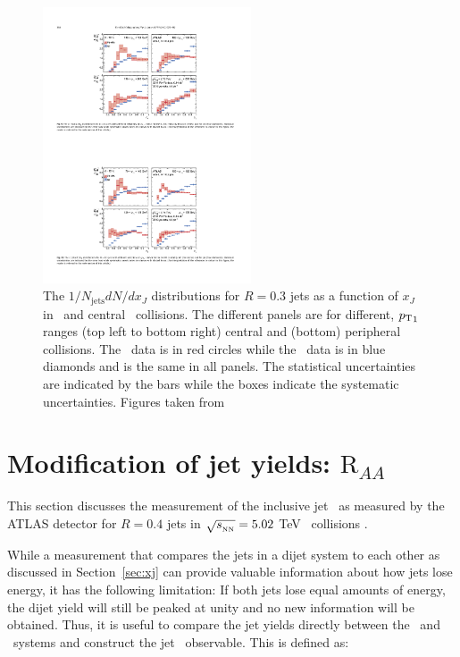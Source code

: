 \begin{figure}[htbp]
\begin{center}
\includegraphics[width=0.55\textwidth]{figures/jetMeasurements/xJ_R03}
\caption{The $1/N_\mathrm{jets} dN/dx_J$ distributions for $R=0.3$ jets as a function of $x_J$ in \pp\ and central \pbpb\ collisions. The different panels are for different, $\mbox{$p_{\mathrm{T}}$}_1$ ranges (top left to bottom right) central and (bottom) peripheral collisions. The \pbpb\ data is in red circles while the \pp\ data is in blue diamonds and is the same in all panels. The statistical uncertainties are indicated by the bars while the boxes indicate the systematic uncertainties. Figures taken from \cite{Aaboud:2017eww}}
\label{fig:xJ_R03}
\end{center}
\end{figure}


\section{Modification of jet yields: $\mathrm{R}_{AA}$}
This section discusses the measurement of the inclusive jet \RAA\ as measured by the ATLAS detector for $R=0.4$ jets in $\mbox{$\sqrt{s_{_\text{NN}}}$}=5.02$ TeV \pbpb\ collisions \cite{2019108}.

While a measurement that compares the jets in a dijet system to each other as discussed in Section~\ref{sec:xj} can provide valuable information about how jets lose energy, it has the following limitation: If both jets lose equal amounts of energy, the dijet yield will still be peaked at unity and no new information will be obtained. Thus, it is useful to compare the jet yields directly between the \pp\ and \pbpb\ systems and construct the jet \RAA\ observable. This is defined as:

